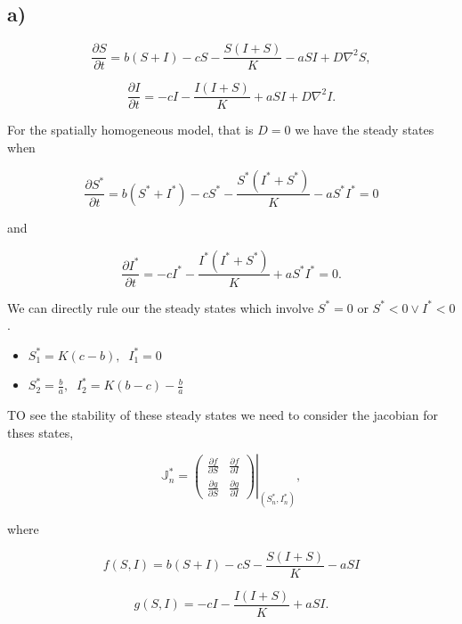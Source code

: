 \subsection{a)}

\begin{equation}
\label{eq:partSt}
\frac{\partial S}{\partial t} = b(S+I)-cS -\frac{S(I+S)}{K}-aSI + D\nabla^2S,
\end{equation}

\begin{equation}
\label{eq:partIt}
\frac{\partial I}{\partial t}= -cI -\frac{I(I+S)}{K}+aSI +D\nabla^2I.
\end{equation}

For the spatially homogeneous model, that is $D=0$ we have the steady states when

$$
\frac{\partial S^*}{\partial t}=b(S^*+I^*)-cS^*-\frac{S^*(I^*+S^*)}{K}-aS^*I^* =0
$$

and

$$
\frac{\partial I^*}{\partial t}=-cI^*-\frac{I^*(I^*+S^*)}{K}+aS^*I^*=0.
$$

We can directly rule our the steady states which involve $S^*=0$ or $S^*<0 \vee I^*<0$.

\begin{itemize}
\item $S^*_1=K(c-b), \;\; I^*_1=0$
\item $S^*_2=\frac{b}{a}, \;\; I^*_2=K(b-c)-\frac{b}{a}$ 
\end{itemize}



TO see the stability of these steady states we need to consider the jacobian for thses states,

\begin{equation}
\mathbb{J}^*_n=\left.\left(
\begin{array}{cc}
\frac{\partial f}{\partial S} & \frac{\partial f}{\partial I} \\
\frac{\partial g}{\partial S} & \frac{\partial g}{\partial I}
\end{array}\right)\right|_{(S^*_n,I^*_n)},
\end{equation}

where 

\begin{equation}
f(S,I)=b(S+I)-cS-\frac{S(I+S)}{K}-aSI
\end{equation}

\begin{equation}
g(S,I)=-cI-\frac{I(I+S)}{K}+aSI.
\end{equation}

